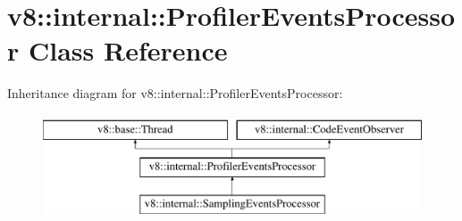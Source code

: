 \hypertarget{classv8_1_1internal_1_1ProfilerEventsProcessor}{}\section{v8\+:\+:internal\+:\+:Profiler\+Events\+Processor Class Reference}
\label{classv8_1_1internal_1_1ProfilerEventsProcessor}
Inheritance diagram for v8\+:\+:internal\+:\+:Profiler\+Events\+Processor\+:\begin{figure}[H]
\begin{center}
\leavevmode
\includegraphics[height=3.000000cm]{classv8_1_1internal_1_1ProfilerEventsProcessor}
\end{center}
\end{figure}
